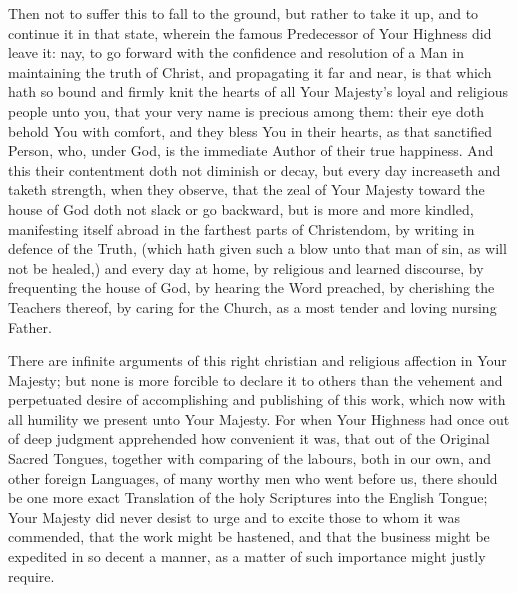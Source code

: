 Then not to suffer this to fall to the ground, but rather to take it up, and to continue it in that state, wherein the famous Predecessor of Your Highness did leave it: nay, to go forward with the confidence and resolution of a Man in maintaining the truth of Christ, and propagating it far and near, is that which hath so bound and firmly knit the hearts of all Your Majesty's loyal and religious people unto you, that your very name is precious among them: their eye doth behold You with comfort, and they bless You in their hearts, as that sanctified Person, who, under God, is the immediate Author of their true happiness. And this their contentment doth not diminish or decay, but every day increaseth and taketh strength, when they observe, that the zeal of Your Majesty toward the house of God doth not slack or go backward, but is more and more kindled, manifesting itself abroad in the farthest parts of Christendom, by writing in defence of the Truth, (which hath given such a blow unto that man of sin, as will not be healed,) and every day at home, by religious and learned discourse, by frequenting the house of God, by hearing the Word preached, by cherishing the Teachers thereof, by caring for the Church, as a most tender and loving nursing Father.

There are infinite arguments of this right christian and religious affection in Your Majesty; but none is more forcible to declare it to others than the vehement and perpetuated desire of accomplishing and publishing of this work, which now with all humility we present unto Your Majesty. For when Your Highness had once out of deep judgment apprehended how convenient it was, that out of the Original Sacred Tongues, together with comparing of the labours, both in our own, and other foreign Languages, of many worthy men who went before us, there should be one more exact Translation of the holy Scriptures into the English Tongue; Your Majesty did never desist to urge and to excite those to whom it was commended, that the work might be hastened, and that the business might be expedited in so decent a manner, as a matter of such importance might justly require.

